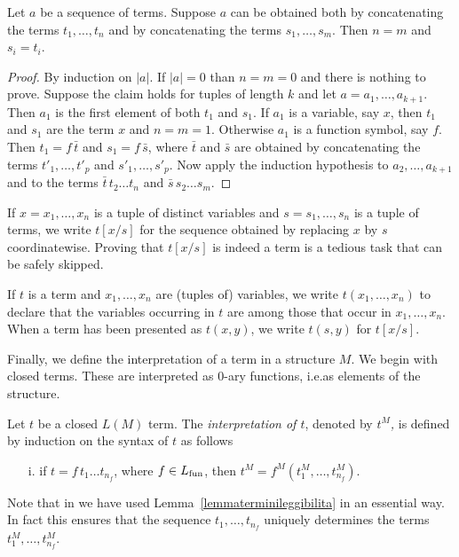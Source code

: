 \begin{lemma}\label{lemmaterminileggibilita}
Let $a$ be a sequence of terms. Suppose $a$ can be obtained both by concatenating the terms $t_1,\dots,t_n$ and by concatenating the terms $s_1,\dots,s_m$. Then $n=m$ and $s_i=t_i$.
\end{lemma}
\begin{proof}
By induction on $|a|$. If $|a|=0$ than $n=m=0$ and there is nothing to prove. Suppose the claim holds for tuples of length $k$ and let $a=a_1,\dots,a_{k+1}$. Then $a_1$ is the first element of both  $t_1$ and $s_1$. If $a_1$ is a variable, say $x$, then $t_1$ and $s_1$ are the term $x$ and $n=m=1$. Otherwise $a_1$ is a function symbol, say $f$. Then $t_1=f\,\bar t$ and $s_1=f\,\bar s$, where $\bar t$ and $\bar s$ are obtained by concatenating the terms $t'_1, \dots, t'_p$ and $s'_1, \dots, s'_p$.
Now apply the induction hypothesis to $a_2,\dots,a_{k+1}$ and to the terms $\bar t\, t_2\dots t_n$ and $\bar s\,s_2\dots s_m$.
\end{proof}

If $x=x_1,\dots,x_n$ is a tuple of distinct variables and $s=s_1,\dots,s_n$ is a tuple of terms, we write \emph{$t[x/s]$\/} for the sequence obtained by replacing $x$ by $s$ coordinatewise. Proving that $t[x/s]$ is indeed a term is a tedious task that can be safely skipped.

If $t$ is a term and $x_1,\dots,x_n$ are (tuples of) variables, we write \emph{$t(x_1,\dots,x_n)$\/} to declare that the variables occurring in $t$ are among those that occur in $x_1,\dots,x_n$. When a term has been presented as $t(x,y)$, we write \emph{$t(s,y)$\/} for $t[x/s]$.

Finally, we define the interpretation of a term in a structure $M$. We begin with closed terms. These are interpreted as $0$-ary functions, i.e.\@ as elements of the structure.

\begin{definition}\label{defterminiinterpretazione}
Let $t$ be a closed $L(M)$ term.
The \emph{interpretation of $t$}, denoted by \emph{$t^M$,} is defined by induction on the syntax of $t$ as follows

\begin{itemize}
\item[i.] if $t=f\,t_1\dots t_{n_f}$, where $f\in L_{\rm fun}$, then $t^M=f^M(t^M_1, \dots, t^M_{n_f})$.
\end{itemize}
Note that in  we have used Lemma~\ref{lemmaterminileggibilita} in an essential way. In fact this ensures that the sequence $t_1,\dots,t_{n_f}$ uniquely determines the terms $t_1^M, \dots, t_{n_f}^M$.
\end{definition}

